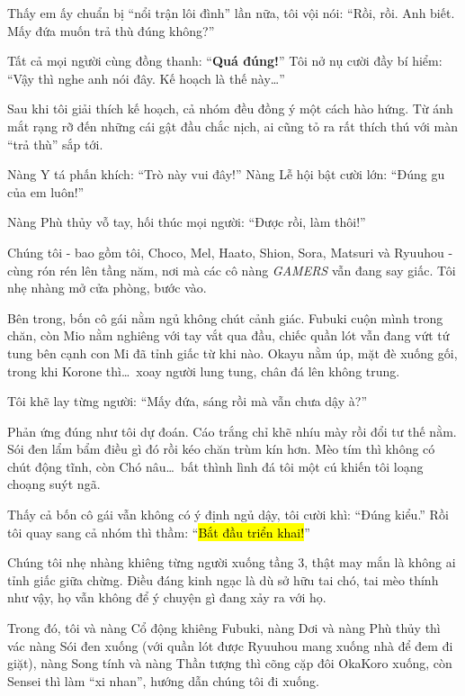 \documentclass[../main.tex]{subfiles}
\begin{document}
Thấy em ấy chuẩn bị ``nổi trận lôi đình'' lần nữa, tôi vội nói: ``Rồi, rồi. Anh biết. Mấy đứa muốn trả thù đúng không?''

Tất cả mọi người cùng đồng thanh: ``\textbf{Quá đúng!}'' Tôi nở nụ cười đầy bí hiểm: ``Vậy thì nghe anh nói đây. Kế hoạch là thế này\dots''

Sau khi tôi giải thích kế hoạch, cả nhóm đều đồng ý một cách hào hứng. Từ ánh mắt rạng rỡ đến những cái gật đầu chắc nịch, ai cũng tỏ ra rất thích thú với màn ``trả thù'' sắp tới.

Nàng Y tá phấn khích: ``Trò này vui đây!'' Nàng Lễ hội bật cười lớn: ``Đúng gu của em luôn!''

Nàng Phù thủy vỗ tay, hối thúc mọi người: ``Được rồi, làm thôi!''

\ct

Chúng tôi - bao gồm tôi, Choco, Mel, Haato, Shion, Sora, Matsuri và Ryuuhou - cùng rón rén lên tầng năm, nơi mà các cô nàng \textit{GAMERS} vẫn đang say giấc. Tôi nhẹ nhàng mở cửa phòng, bước vào.

Bên trong, bốn cô gái nằm ngủ không chút cảnh giác. Fubuki cuộn mình trong chăn, còn Mio nằm nghiêng với tay vắt qua đầu, chiếc quần lót vẫn đang vứt tứ tung bên cạnh con Mi đã tỉnh giấc từ khi nào. Okayu nằm úp, mặt đè xuống gối, trong khi Korone thì\dots\ xoay người lung tung, chân đá lên không trung.

Tôi khẽ lay từng người: ``Mấy đứa, sáng rồi mà vẫn chưa dậy à?''

Phản ứng đúng như tôi dự đoán. Cáo trắng chỉ khẽ nhíu mày rồi đổi tư thế nằm. Sói đen lẩm bẩm điều gì đó rồi kéo chăn trùm kín hơn. Mèo tím thì không có chút động tĩnh, còn Chó nâu\dots\ bất thình lình đá tôi một cú khiến tôi loạng choạng suýt ngã.

Thấy cả bốn cô gái vẫn không có ý định ngủ dậy, tôi cười khì: ``Đúng kiểu.'' Rồi tôi quay sang cả nhóm thì thầm: ``\hl{Bắt đầu triển khai!}''

\ct

Chúng tôi nhẹ nhàng khiêng từng người xuống tầng 3, thật may mắn là không ai tỉnh giấc giữa chừng. Điều đáng kinh ngạc là dù sở hữu tai chó, tai mèo thính như vậy, họ vẫn không để ý chuyện gì đang xảy ra với họ.

Trong đó, tôi và nàng Cổ động khiêng Fubuki, nàng Dơi và nàng Phù thủy thì vác nàng Sói đen xuống (với quần lót được Ryuuhou mang xuống nhà để đem đi giặt), nàng Song tính và nàng Thần tượng thì cõng cặp đôi OkaKoro xuống, còn Sensei thì làm ``xi nhan'', hướng dẫn chúng tôi đi xuống.
\end{document}
